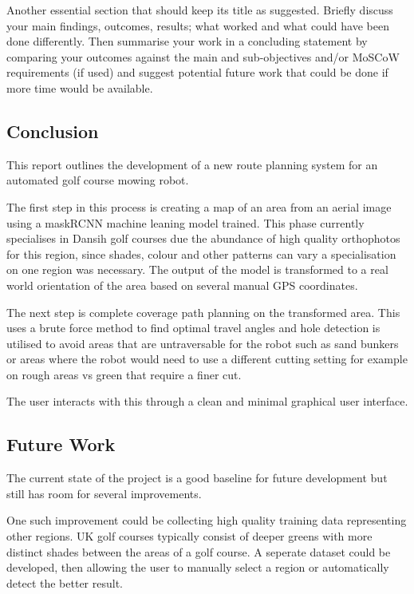 \documentclass[final]{cmpreport_02}
\begin{document}
Another essential section that should keep its title as suggested. Briefly discuss your main findings, outcomes, results; what worked and what could have been done differently. Then summarise your work in a concluding statement by comparing your outcomes against the main and sub-objectives and/or MoSCoW requirements (if used) and suggest potential future work that could be done if more time would be available.

\subsection{Conclusion}
This report outlines the development of a new route planning system for an automated golf course mowing robot. 

The first step in this process is creating a map of an area from an aerial image using a maskRCNN machine leaning model trained.
This phase currently specialises in Dansih golf courses due the abundance of high quality orthophotos for this region, since shades, colour and other patterns can vary a specialisation on one region was necessary.
The output of the model is transformed to a real world orientation of the area based on several manual GPS coordinates.

The next step is complete coverage path planning on the transformed area.
This uses a brute force method to find optimal travel angles and hole detection is utilised to avoid areas that are untraversable for the robot such as sand bunkers or areas where the robot would need to use a different cutting setting for example on rough areas vs green that require a finer cut.

The user interacts with this through a clean and minimal graphical user interface.


\subsection{Future Work}

The current state of the project is a good baseline for future development but still has room for several improvements.

One such improvement could be collecting high quality training data representing other regions. UK golf courses typically consist of deeper greens with more distinct shades between the areas of a golf course. A seperate dataset could be developed, then allowing the user to manually select a region or automatically detect the better result.
\end{document}
